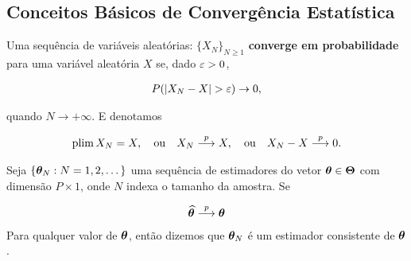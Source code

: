 \documentclass[11pt, oneside, a4paper, article]{article}
\numberwithin{equation}{section}
\begin{document}
\begin{description}
\clearpage
\section{Conceitos Básicos de Convergência Estatística} \label{app:est}

\begin{defn}
	\citet[Def 3.3, p.36 ]{wool-2010}

	Uma sequência de variáveis aleatórias:
	$\{ X_{N} \}_{N \geq 1}$ 
	\textbf{converge em probabilidade} para uma variável aleatória $X$ se, dado $\varepsilon > 0$, 

	\vspace{-1 em}
	\begin{align*}
		P(| X_{N} - X | > \varepsilon ) \to 0,
	\end{align*}

	\noindent
	quando $N \to + \infty$.
	E denotamos

	\vspace{-1 em}
	\begin{align*}
		\text{plim} \, X_{N} = X,
		\quad \text{ou}	\quad
		X_{N}  \overset{p}{\longrightarrow}  X,
		\quad \text{ou}	\quad
		X_{N} - X  \overset{p}{\longrightarrow}  0.
	\end{align*}
\end{defn}

\begin{defn}
	\citet[Def 3.8, p.40 ]{wool-2010}

	Seja $\{\boldsymbol{\theta}_{N}: N=1, 2, \dots\}$ uma sequência de estimadores do vetor $\boldsymbol{\theta} \in \boldsymbol{\Theta}$ com dimensão $P \times 1$, onde $N$ indexa o tamanho da amostra.
	Se

	\vspace{-1 em}
	\begin{align} \label{consist}
		\widehat{\boldsymbol{\theta}} \overset{p}{\longrightarrow} \boldsymbol{\theta}
	\end{align}
	Para qualquer valor de $\boldsymbol{\theta}$, então dizemos que $\boldsymbol{\theta}_{N}$ é um estimador consistente de $\boldsymbol{\theta}$.
\end{defn}

\begin{teo} \label{teo:lgn}


\end{teo}
\end{description}
\end{document}
